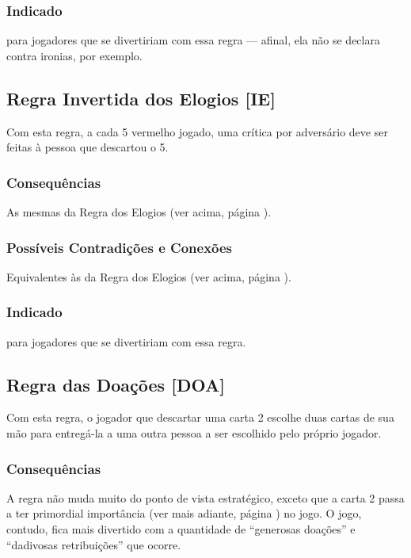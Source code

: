 \subsubsection{Indicado} 

para jogadores que se divertiriam com essa regra --- afinal, ela não se declara contra ironias, por exemplo.

\subsection{Regra Invertida dos Elogios [IE]}

Com esta regra, a cada 5 vermelho jogado, uma crítica por adversário deve ser feitas à pessoa que descartou o 5.

\subsubsection{Consequências}

As mesmas da Regra dos Elogios (ver acima, página \pageref{elogios}).

\subsubsection{Possíveis Contradições e Conexões}

Equivalentes às da Regra dos Elogios (ver acima, página \pageref{elogios}).

\subsubsection{Indicado}

para jogadores que se divertiriam com essa regra.

\subsection{Regra das Doações [DOA]}

Com esta regra, o jogador que descartar uma carta 2 escolhe duas cartas de sua mão para entregá-la a uma outra pessoa a ser escolhido pelo próprio jogador.

\subsubsection{Consequências}

A regra não muda muito do ponto de vista estratégico, exceto que a carta 2 passa a ter primordial importância (ver mais adiante, página \pageref{armas}) no jogo. O jogo, contudo, fica mais divertido com a quantidade de ``generosas doações'' e ``dadivosas retribuições'' que ocorre.

